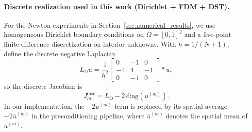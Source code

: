 \documentclass{article}
\theoremstyle{plain}
\theoremstyle{remark}
\begin{document}
\paragraph{Discrete realization used in this work (Dirichlet + FDM + DST).}
For the Newton experiments in Section~\ref{sec:numerical_results}, we use homogeneous Dirichlet boundary conditions on $\Omega=[0,1]^2$ and a five-point finite-difference discretization on interior unknowns. With $h=1/(N+1)$, define the discrete negative Laplacian
\begin{equation}
L_{\mathrm{D}}u
=
\frac{1}{h^2}
\begin{bmatrix}
0 & -1 & 0\\
-1 & 4 & -1\\
0 & -1 & 0
\end{bmatrix}*u,
\end{equation}
so the discrete Jacobian is
\begin{equation}
J_m^{\mathrm{disc}} = L_{\mathrm{D}} - 2\,\mathrm{diag}(u^{(m)}).
\end{equation}
In our implementation, the $-2u^{(m)}$ term is replaced by its spatial average $-2\bar{u}^{(m)}$ in the preconditioning pipeline, where $\bar{u}^{(m)}$ denotes the spatial mean of $u^{(m)}$.
\end{document}
